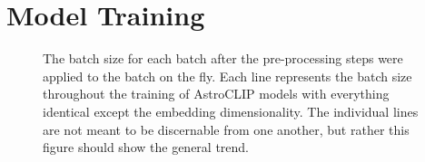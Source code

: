 
\section{Model Training}\label{sec:training}
\begin{figure}[t]
    \centering
    \caption{The batch size for each batch after the pre-processing steps were applied to the batch on the fly.
    Each line represents the batch size throughout the training of AstroCLIP models with everything identical except the
    embedding dimensionality.
    The individual lines are not meant to be discernable from one another, but rather this figure should show the general trend.}
    \label{fig:train_batch_size}
\end{figure}

